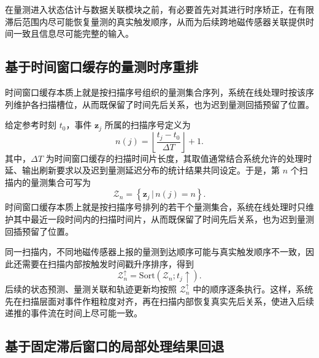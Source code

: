 \documentclass{xdupgthesis}
\begin{document}
在量测进入状态估计与数据关联模块之前，有必要首先对其进行时序矫正，在有限滞后范围内尽可能恢复量测的真实触发顺序，从而为后续跨地磁传感器关联提供时间一致且信息尽可能完整的输入。

\subsection{基于时间窗口缓存的量测时序重排}

时间窗口缓存本质上就是按扫描序号组织的量测集合序列，系统在线处理时按该序列维护各扫描槽位，从而既保留了时间先后关系，也为迟到量测回插预留了位置。

给定参考时刻 $t_0$，事件 $\mathbf z_j$ 所属的扫描序号定义为
\begin{equation}
	n(j)=\left\lfloor \frac{t_j-t_0}{\Delta T} \right\rfloor +1.
	\label{eq:ch3_scan_index}
\end{equation}
其中，$\Delta T$ 为时间窗口缓存的扫描时间片长度，其取值通常结合系统允许的处理时延、输出刷新要求以及迟到量测延迟分布的统计结果共同设定。于是，第 $n$ 个扫描内的量测集合可写为
\begin{equation}
	\mathcal Z_n=
	\left\{
	\mathbf z_j\,\big|\, n(j)=n
	\right\}.
	\label{eq:ch3_scan_set}
\end{equation}
时间窗口缓存本质上就是按扫描序号排列的若干个量测集合，系统在线处理时只维护其中最近一段时间内的扫描时间片，从而既保留了时间先后关系，也为迟到量测回插预留了位置。

同一扫描内，不同地磁传感器上报的量测到达顺序可能与真实触发顺序不一致，因此还需要在扫描内部按触发时间戳升序排序，得到
\begin{equation}
	\mathcal Z_n^{\uparrow}=\mathrm{Sort}\left(\mathcal Z_n; t_j\uparrow\right).
	\label{eq:ch3_scan_sort}
\end{equation}
后续的状态预测、量测关联和轨迹更新均按照 $\mathcal Z_n^{\uparrow}$ 中的顺序逐条执行。这样，系统先在扫描层面对事件作粗粒度对齐，再在扫描内部恢复真实先后关系，使进入后续递推的事件流在时间上尽可能一致。

\subsection{基于固定滞后窗口的局部处理结果回退}
\end{document}
